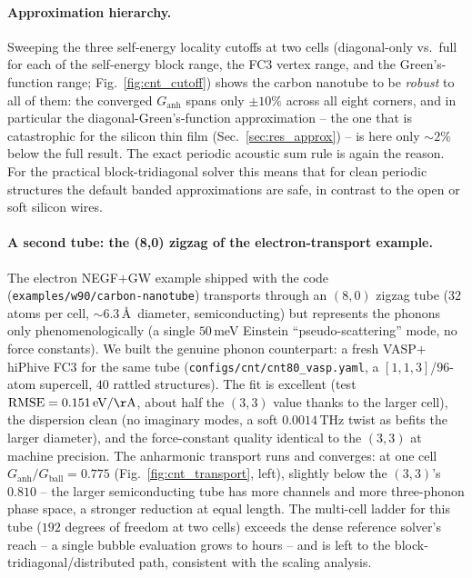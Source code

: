 \paragraph{Approximation hierarchy.} Sweeping the three self-energy locality cutoffs at two cells
(diagonal-only vs.\ full for each of the self-energy block range, the FC3 vertex range, and the
Green's-function range; Fig.~\ref{fig:cnt_cutoff}) shows the carbon nanotube to be \emph{robust} to all
of them: the converged $G_\mathrm{anh}$ spans only $\pm10\%$ across all eight corners, and in
particular the diagonal-Green's-function approximation -- the one that is catastrophic for the silicon
thin film (Sec.~\ref{sec:res_approx}) -- is here only $\sim\!2\%$ below the full result. The
exact periodic acoustic sum rule is again the reason. For the practical block-tridiagonal solver this
means that for clean periodic structures the default banded approximations are safe, in contrast to the
open or soft silicon wires.

\paragraph{A second tube: the (8,0) zigzag of the electron-transport example.} The electron NEGF$+$GW
example shipped with the code (\texttt{examples/w90/carbon-nanotube}) transports through an $(8,0)$
zigzag tube ($32$ atoms per cell, $\sim\!6.3$\,\AA\ diameter, semiconducting) but represents the phonons
only phenomenologically (a single $50$\,meV Einstein ``pseudo-scattering'' mode, no force constants). We
built the genuine phonon counterpart: a fresh VASP$+$hiPhive FC3 for the same tube
(\texttt{configs/cnt/cnt80\_vasp.yaml}, a $[1,1,3]$/$96$-atom supercell, $40$ rattled structures). The
fit is excellent (test $\mathrm{RMSE}=0.151\,\mathrm{eV/\AA}$, about half the $(3,3)$ value thanks to
the larger cell), the dispersion clean (no imaginary modes, a soft $0.0014\,\mathrm{THz}$ twist as
befits the larger diameter), and the force-constant quality identical to the $(3,3)$ at machine
precision. The anharmonic transport runs and converges: at one cell $G_\mathrm{anh}/G_\mathrm{ball} =
\mathbf{0.775}$ (Fig.~\ref{fig:cnt_transport}, left), slightly below the $(3,3)$'s $0.810$ -- the larger
semiconducting tube has more channels and more three-phonon phase space, a stronger reduction at equal
length. The multi-cell ladder for this tube ($192$ degrees of freedom at two cells) exceeds the dense
reference solver's reach -- a single bubble evaluation grows to hours -- and is left to the
block-tridiagonal/distributed path, consistent with the scaling analysis.

